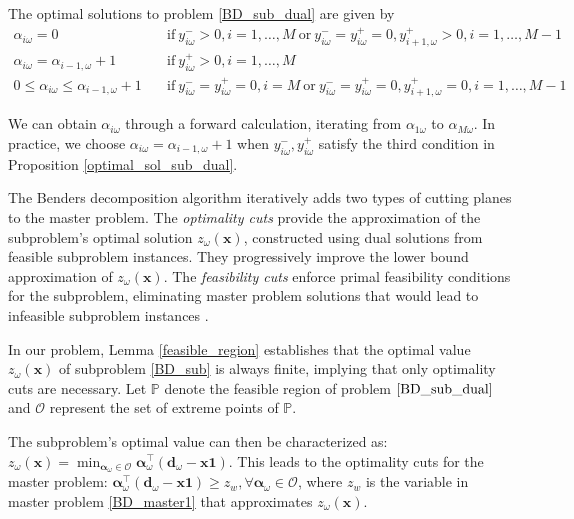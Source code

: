 \begin{prop}\label{optimal_sol_sub_dual}
  The optimal solutions to problem \eqref{BD_sub_dual} are given by 
\begin{equation}\label{BD_sub_simplified}
  \begin{aligned}
    \alpha_{i \omega} = 0 \quad & \text{if}~  y_{i \omega}^{-} > 0,  i =1,\ldots, M~\text{or}~ y_{i \omega}^{-} = y_{i \omega}^{+} = 0, y_{i+1, \omega}^{+}> 0, i = 1,\ldots, M-1 \\
    \alpha_{i \omega} = \alpha_{i-1, \omega}+1 \quad & \text{if}~ y_{i \omega}^{+} > 0, i =1,\ldots, M \\
    0 \leq \alpha_{i \omega} \leq \alpha_{i-1, \omega}+1 \quad & \text{if}~ y_{i \omega}^{-} = y_{i \omega}^{+} = 0, i = M~\text{or}~ y_{i \omega}^{-} = y_{i \omega}^{+} = 0, y_{i+1, \omega}^{+}= 0, i = 1,\ldots, M-1
  \end{aligned}
\end{equation}
\end{prop}


We can obtain $\alpha_{i \omega}$ through a forward calculation, iterating from $\alpha_{1 \omega}$ to $\alpha_{M\omega}$. In practice, we choose $\alpha_{i \omega} = \alpha_{i-1, \omega}+1$ when $y_{i \omega}^{-}, y_{i \omega}^{+}$ satisfy the third condition in Proposition \ref{optimal_sol_sub_dual}.


The Benders decomposition algorithm iteratively adds two types of cutting planes to the master problem.
The \textit{optimality cuts} provide the approximation of the subproblem's optimal solution $z_{\omega}(\mathbf{x})$, constructed using dual solutions from feasible subproblem instances. They progressively improve the lower bound approximation of $z_{\omega}(\mathbf{x})$. The \textit{feasibility cuts} enforce primal feasibility conditions for the subproblem, eliminating master problem solutions that would lead to infeasible subproblem instances \citep{rahmaniani2017benders}.

In our problem, Lemma \ref{feasible_region} establishes that the optimal value $z_{\omega}(\mathbf{x})$ of subproblem \eqref{BD_sub} is always finite, implying that only optimality cuts are necessary. Let $\mathbb{P}$ denote the feasible region of problem $\eqref{BD_sub_dual}$ and $\mathcal{O}$ represent the set of extreme points of $\mathbb{P}$. 

The subproblem's optimal value can then be characterized as: $z_{\omega}(\mathbf{x}) = \min_{\bm{\alpha}_{\omega} \in \mathcal{O}} \bm{\alpha}_{\omega}^{\intercal}(\mathbf{d}_{\omega}- \mathbf{x} \mathbf{1})$. This leads to the optimality cuts for the master problem: $\bm{\alpha}_{\omega}^{\intercal}(\mathbf{d}_{\omega}- \mathbf{x} \mathbf{1}) \geq z_w, \forall \bm{\alpha}_{\omega} \in \mathcal{O}$, where $z_w$ is the variable in master problem \eqref{BD_master1} that approximates $z_{\omega}(\mathbf{x})$.



